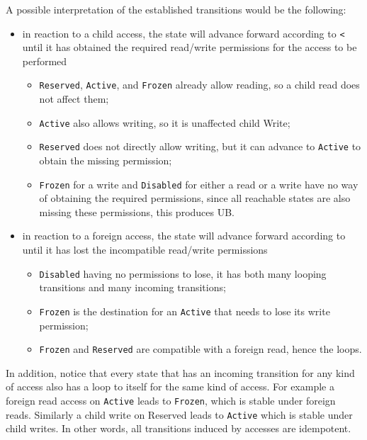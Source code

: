 \documentclass[a4paper,11pt]{article}
\theoremstyle{plain}
\theoremstyle{definition}
\theoremstyle{remark}
\newcommand{\tcode}[1]{\rstinline{#1}}
\newcommand{\tperm}[1]{\texttt{#1}}
\begin{document}
A possible interpretation of the established transitions would be the following:
\begin{itemize}
    \item in reaction to a child access, the state will advance forward according to \tperm{<} until
        it has obtained the required read/write permissions for the access to be performed
        \begin{itemize}
            \item \tperm{Reserved}, \tperm{Active}, and \tperm{Frozen} already allow reading,
                so a child read does not affect them;
            \item \tperm{Active} also allows writing, so it is unaffected child Write;
            \item \tperm{Reserved} does not directly allow writing, but it can advance to \tperm{Active} to
                obtain the missing permission;
            \item \tperm{Frozen} for a write and \tperm{Disabled} for either a read or a write have no way of
                obtaining the required permissions, since all reachable states are also missing these
                permissions, this produces UB.
        \end{itemize}
    \item in reaction to a foreign access, the state will advance forward according to \tcode{<} until
        it has lost the incompatible read/write permissions
        \begin{itemize}
            \item \tperm{Disabled} having no permissions to lose, it has both many looping transitions and many incoming transitions;
            \item \tperm{Frozen} is the destination for an \tperm{Active} that needs to lose its write permission;
            \item \tperm{Frozen} and \tperm{Reserved} are compatible with a foreign read, hence the loops.
        \end{itemize}
\end{itemize}

In addition, notice that every state that has an incoming transition for any kind of
access also has a loop to itself for the same kind of access. For example a foreign read
access on \tperm{Active} leads to \tperm{Frozen}, which is stable under foreign reads. Similarly
a child write on Reserved leads to \tperm{Active} which is stable under child writes.
In other words, all transitions induced by accesses are idempotent.
\end{document}
